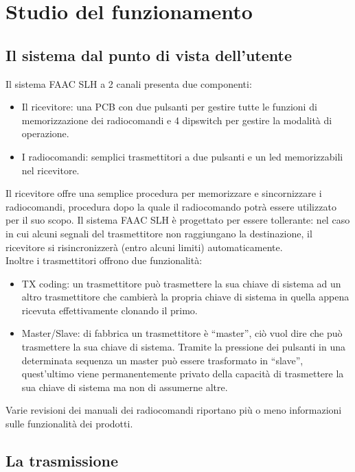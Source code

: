 \chapter{Studio del funzionamento}
\label{cha:analysis}

\section{Il sistema dal punto di vista dell'utente}
\label{sec:ux}

Il sistema FAAC SLH a 2 canali presenta due componenti:
\begin{itemize}
  \item Il ricevitore: una PCB con due pulsanti per gestire tutte le funzioni di memorizzazione dei radiocomandi e 4 dipswitch per gestire la modalità di operazione.
  \item I radiocomandi: semplici trasmettitori a due pulsanti e un led memorizzabili nel ricevitore.
\end{itemize}
Il ricevitore offre una semplice procedura per memorizzare e sincornizzare i radiocomandi, procedura dopo la quale il radiocomando potrà essere utilizzato per il suo scopo. Il sistema FAAC SLH è progettato per essere tollerante: nel caso in cui alcuni segnali del trasmettitore non raggiungano la destinazione, il ricevitore si risincronizzerà (entro alcuni limiti) automaticamente.\\
Inoltre i trasmettitori offrono due funzionalità:
\begin{itemize}
  \item TX coding: un trasmettitore può trasmettere la sua chiave di sistema ad un altro trasmettitore che cambierà la propria chiave di sistema in quella appena ricevuta effettivamente clonando il primo.
  \item Master/Slave: di fabbrica un trasmettitore è “master”, ciò vuol dire che può trasmettere la sua chiave di sistema. Tramite la pressione dei pulsanti in una determinata sequenza un master può essere trasformato in “slave”, quest’ultimo viene permanentemente privato della capacità di trasmettere la sua chiave di sistema ma non di assumerne altre.
\end{itemize}
Varie revisioni dei manuali  \cite{man1,man2} dei radiocomandi riportano più o meno informazioni sulle funzionalità dei prodotti.

\section{La trasmissione}
\label{sec:transmission}

